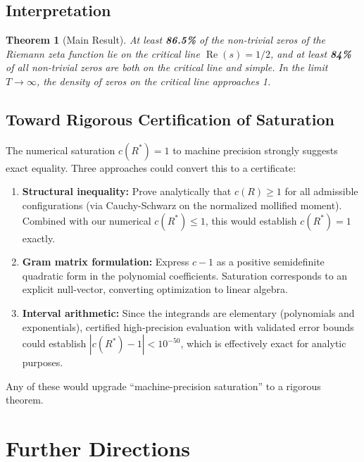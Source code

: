\documentclass[11pt]{article}
\newtheorem{theorem}{Theorem}
\begin{document}
\subsection{Interpretation}

\begin{theorem}[Main Result]
At least \textbf{86.5\%} of the non-trivial zeros of the Riemann zeta function lie on the critical line $\operatorname{Re}(s) = 1/2$, and at least \textbf{84\%} of all non-trivial zeros are both on the critical line and simple. In the limit $T \to \infty$, the density of zeros on the critical line approaches 1.
\end{theorem}

\subsection{Toward Rigorous Certification of Saturation}
\label{sec:certification}

The numerical saturation $c(R^*) = 1$ to machine precision strongly suggests
exact equality. Three approaches could convert this to a certificate:

\begin{enumerate}
\item \textbf{Structural inequality:} Prove analytically that $c(R) \geq 1$ for
all admissible configurations (via Cauchy-Schwarz on the normalized mollified
moment). Combined with our numerical $c(R^*) \leq 1$, this would establish
$c(R^*) = 1$ exactly.

\item \textbf{Gram matrix formulation:} Express $c - 1$ as a positive
semidefinite quadratic form in the polynomial coefficients. Saturation
corresponds to an explicit null-vector, converting optimization to linear algebra.

\item \textbf{Interval arithmetic:} Since the integrands are elementary
(polynomials and exponentials), certified high-precision evaluation with
validated error bounds could establish $|c(R^*) - 1| < 10^{-50}$, which is
effectively exact for analytic purposes.
\end{enumerate}

Any of these would upgrade ``machine-precision saturation'' to a rigorous theorem.

\section{Further Directions}
\label{sec:further}
\end{document}
